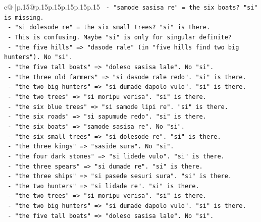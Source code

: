 \documentclass{article}
\begin{document}
{\begin{supertabular}{c@{$\;$}|p{.15\linewidth}@{}p{.15\linewidth}p{.15\linewidth}p{.15\linewidth}p{.15\linewidth}p{.15\linewidth}}
{{{\texttt{                 {-} "samode sasisa re" = the six boats? "si" is missing.} \\
\texttt{                 {-} "si dolesode re" = the six small trees? "si" is there.} \\
\texttt{                 {-} This is confusing. Maybe "si" is only for singular definite?} \\
\texttt{                 {-} "the five hills" => "dasode rale" (in "five hills find two big hunters"). No "si".} \\
\texttt{                 {-} "the five tall boats" => "doleso sasisa lale". No "si".} \\
\texttt{                 {-} "the three old farmers" => "si dasode rale redo". "si" is there.} \\
\texttt{                 {-} "the two big hunters" => "si dumade dapolo vulo". "si" is there.} \\
\texttt{                 {-} "the two trees" => "si moripu verisa". "si" is there.} \\
\texttt{                 {-} "the six blue trees" => "si samode lipi re". "si" is there.} \\
\texttt{                 {-} "the six roads" => "si sapumude redo". "si" is there.} \\
\texttt{                 {-} "the six boats" => "samode sasisa re". No "si".} \\
\texttt{                 {-} "the six small trees" => "si dolesode re". "si" is there.} \\
\texttt{                 {-} "the three kings" => "saside sura". No "si".} \\
\texttt{                 {-} "the four dark stones" => "si lidede vulo". "si" is there.} \\
\texttt{                 {-} "the three spears" => "si dumade re". "si" is there.} \\
\texttt{                 {-} "the three ships" => "si pasede sesuri sura". "si" is there.} \\
\texttt{                 {-} "the two hunters" => "si lidade re". "si" is there.} \\
\texttt{                 {-} "the two trees" => "si moripu verisa". "si" is there.} \\
\texttt{                 {-} "the two big hunters" => "si dumade dapolo vulo". "si" is there.} \\
\texttt{                 {-} "the five tall boats" => "doleso sasisa lale". No "si".} \\
}}}
\end{supertabular}}
\end{document}

